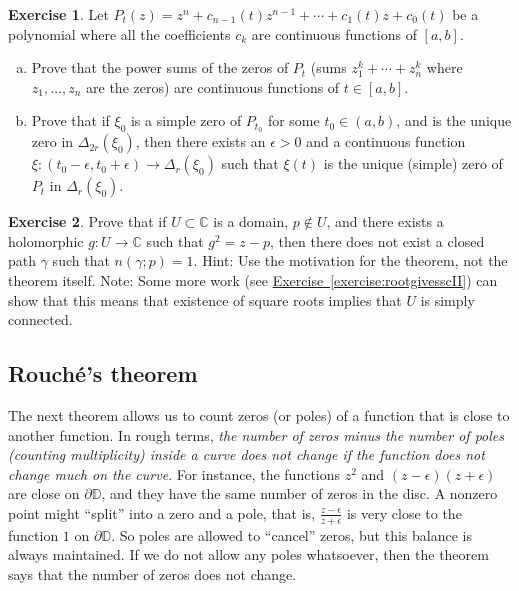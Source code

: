 \documentclass[12pt,openany]{book}
\newcommand{\C}{{\mathbb{C}}}
\newcommand{\D}{{\mathbb{D}}}
\newcommand{\myquote}[1]{``#1''}
\theoremstyle{plain}
\theoremstyle{remark}
\theoremstyle{definition}
\newenvironment{exbox}{%
    \def\FrameCommand{\vrule width 1pt \relax\hspace{10pt}}%
    \MakeFramed{\advance\hsize-\width\FrameRestore}%
}{%
    \endMakeFramed
}
\newenvironment{exparts}{%
    \leavevmode\begin{enumerate}[a),noitemsep,topsep=0pt,parsep=0pt,partopsep=0pt]
}{%
    \end{enumerate}
}
\theoremstyle{exercise}
\newtheorem{exercise}{Exercise}[section]
\theoremstyle{example}
\newcommand{\exerciseref}[1]{\hyperref[#1]{Exercise~\ref*{#1}}}
\begin{document}
\begin{exbox}
\begin{exercise}
Let $P_t(z) = z^n + c_{n-1}(t) z^{n-1} + \cdots + c_1(t) z + c_0(t)$
be a polynomial where all the coefficients $c_k$ are continuous functions
of $[a,b]$.
\begin{exparts}
\item
Prove that the power sums of the zeros of $P_t$
(sums $z_1^k+\cdots+z_n^k$ where $z_1,\ldots,z_n$ are the zeros)
are
continuous functions of $t \in [a,b]$.
\item
Prove that if $\xi_0$ is a simple zero of $P_{t_0}$ for some $t_0 \in (a,b)$,
and is the unique zero in
$\Delta_{2r}(\xi_0)$, then
there exists an $\epsilon > 0$ and a continuous function $\xi \colon
(t_0-\epsilon,t_0+\epsilon) \to \Delta_r(\xi_0)$ such that $\xi(t)$
is the unique (simple) zero of $P_t$ in $\Delta_r(\xi_0)$.
\end{exparts}
\end{exercise}

\begin{exercise} \label{exercise:rootgivesscI}
Prove that if $U \subset \C$ is a domain, $p \notin U$, and there
exists a holomorphic $g \colon U \to \C$ such that $g^2 = z-p$, then 
there does not exist a closed path $\gamma$ such that $n(\gamma;p)=1$.
Hint: Use the motivation for the theorem, not the theorem itself.
Note: Some more work (see \exerciseref{exercise:rootgivesscII})
can show that this means that existence of
square roots implies that $U$ is simply connected.
\end{exercise}
\end{exbox}

\subsection{Rouch\'e's theorem}

The next theorem allows us to count zeros (or poles) of a function that is
close to another function.  In rough terms,
\emph{the number of zeros minus the
number of poles (counting multiplicity) inside a curve does not change
if the function does not change much on the curve}.
For instance, the functions $z^2$ and $(z-\epsilon)(z+\epsilon)$
are close on $\partial \D$, and they have the same number of
zeros in the disc.
A nonzero point might \myquote{split} into a zero and a
pole, that is, $\frac{z-\epsilon}{z+\epsilon}$ is very close to the function
$1$ on $\partial \D$.  So poles are allowed to \myquote{cancel} zeros, but this
balance is always maintained.  If we do not allow any poles
whatsoever, then the theorem says that the number of zeros does not change.
\end{document}
